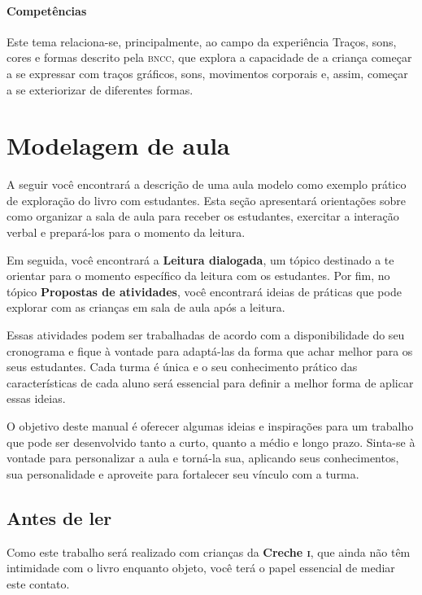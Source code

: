 \documentclass[11pt]{extarticle}
\begin{document}
\paragraph{Competências} Este tema relaciona-se, principalmente, ao 
campo da experiência Traços, sons, cores e formas
descrito pela \textsc{bncc}, que explora a capacidade de a criança começar a se expressar com traços gráficos, sons, movimentos corporais e, assim, começar a se exteriorizar de diferentes formas.


\section{Modelagem de aula}
A seguir você encontrará a descrição de uma aula modelo como exemplo 
prático de exploração do livro com estudantes. Esta seção apresentará 
orientações sobre como organizar a sala de aula para receber os 
estudantes, exercitar a interação verbal e prepará-los para o 
momento da leitura.

Em seguida, você encontrará a \textbf{Leitura dialogada}, um 
tópico destinado a te orientar para o momento específico da 
leitura com os estudantes. Por fim, no tópico 
\textbf{Propostas de atividades}, você encontrará ideias 
de práticas que pode explorar com as crianças em sala de 
aula após a leitura. 

Essas atividades podem ser trabalhadas de acordo com a 
disponibilidade do seu cronograma e fique à vontade para adaptá-las 
da forma que achar melhor para os seus estudantes. Cada turma é única 
e o seu conhecimento prático das características de cada aluno será 
essencial para definir a melhor forma de aplicar essas ideias. 

O objetivo deste manual é oferecer algumas ideias 
e inspirações para um trabalho que pode ser desenvolvido tanto 
a curto, quanto a médio e longo prazo. Sinta-se à vontade para 
personalizar a aula e torná-la sua, aplicando seus conhecimentos, sua 
personalidade e aproveite para fortalecer 
seu vínculo com a turma.


\subsection{Antes de ler}


Como este trabalho será realizado com crianças da \textbf{Creche \textsc{i}}, 
que ainda não têm intimidade com o livro enquanto objeto, você terá o 
papel essencial de mediar este contato. 
\end{document}

